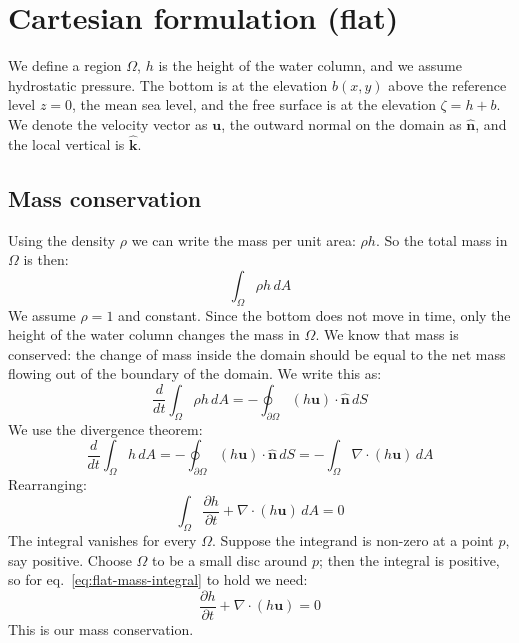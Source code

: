 \newpage
\section{Cartesian formulation (flat)}\label{sec:flat}
We define a region $\Omega$, $h$ is the height of the water column, and we assume hydrostatic pressure. The bottom is at the elevation $b(x,y)$ above the reference level $z = 0$, the mean sea level, and the free surface is at the elevation $\zeta = h + b$. We denote the velocity vector as $\mathbf{u}$, the outward normal on the domain as $\hat{\mathbf{n}}$, and the local vertical is $\hat{\mathbf{k}}$.

\subsection{Mass conservation}\label{sec:car-Mass}
Using the density $\rho$ we can write the mass per unit area: $\rho h$. So the total mass in $\Omega$ is then:
\begin{equation*}
    \int_\Omega\rho h\,dA
\end{equation*}
We assume $\rho = 1$ and constant. Since the bottom does not move in time, only the height of the water column changes the mass in $\Omega$. We know that mass is conserved: the change of mass inside the domain should be equal to the net mass flowing out of the boundary of the domain. We write this as:
\begin{equation*}
    \frac{d}{dt}\int_\Omega\rho h\,dA = -\oint_{\partial\Omega}(h\mathbf{u})\cdot\hat{\mathbf{n}}\,dS
\end{equation*}
We use the divergence theorem:
\begin{equation*}
    \frac{d}{dt}\int_\Omega h\,dA = -\oint_{\partial\Omega}(h\mathbf{u})\cdot\hat{\mathbf{n}}\,dS = -\int_\Omega\nabla\cdot(h\mathbf{u})\,dA
\end{equation*}
Rearranging:
\begin{equation}\label{eq:flat-mass-integral}
    \int_\Omega\frac{\partial h}{\partial t} + \nabla\cdot(h\mathbf{u})\,dA = 0
\end{equation}
The integral vanishes for every $\Omega$. Suppose the integrand is non-zero at a point $p$, say positive. Choose $\Omega$ to be a small disc around $p$; then the integral is positive, so for eq.~\eqref{eq:flat-mass-integral} to hold we need:
\begin{equation}\label{eq:flat-mass}
    \frac{\partial h}{\partial t} + \nabla\cdot(h\mathbf{u}) = 0
\end{equation}
This is our mass conservation.

